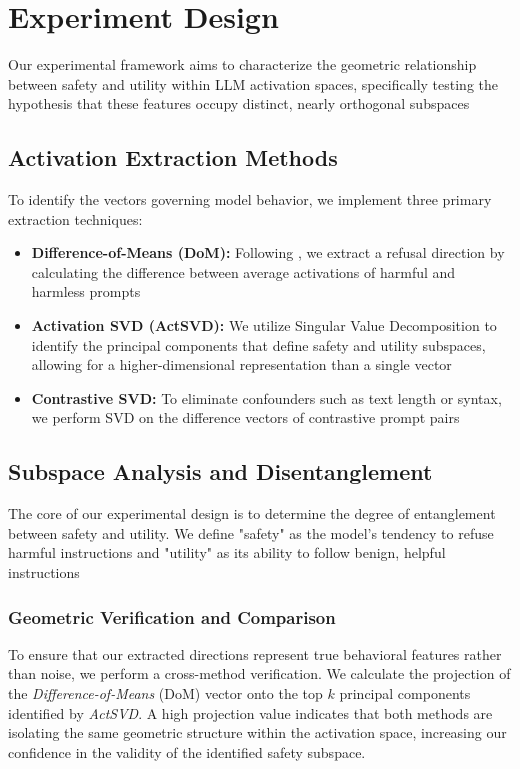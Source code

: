 \section{Experiment Design}
Our experimental framework aims to characterize the geometric relationship between safety and utility within LLM activation spaces, specifically testing the hypothesis that these features occupy distinct, nearly orthogonal subspaces

\subsection{Activation Extraction Methods}
To identify the vectors governing model behavior, we implement three primary extraction techniques:
\begin{itemize}
    \item \textbf{Difference-of-Means (DoM):} Following \citet{arditi2024refusal}, we extract a refusal direction by calculating the difference between average activations of harmful and harmless prompts
    \item \textbf{Activation SVD (ActSVD):} We utilize Singular Value Decomposition to identify the principal components that define safety and utility subspaces, allowing for a higher-dimensional representation than a single vector
    \item \textbf{Contrastive SVD:} To eliminate confounders such as text length or syntax, we perform SVD on the difference vectors of contrastive prompt pairs
\end{itemize}

\subsection{Subspace Analysis and Disentanglement}
\label{subsec:disentanglement}

The core of our experimental design is to determine the degree of entanglement between safety and utility. We define "safety" as the model's tendency to refuse harmful instructions and "utility" as its ability to follow benign, helpful instructions

\subsubsection{Geometric Verification and Comparison}
To ensure that our extracted directions represent true behavioral features rather than noise, we perform a cross-method verification. We calculate the projection of the \textit{Difference-of-Means} (DoM) vector onto the top $k$ principal components identified by \textit{ActSVD}. A high projection value indicates that both methods are isolating the same geometric structure within the activation space, increasing our confidence in the validity of the identified safety subspace.

